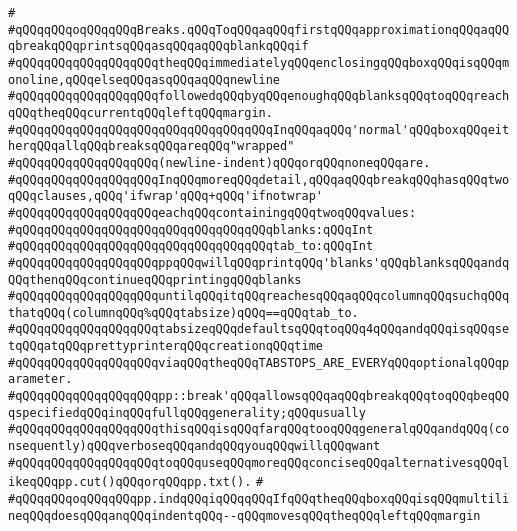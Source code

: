 \verb|#|\newline
\verb|#qQQqqQQqoqQQqqQQqBreaks.qQQqToqQQqaqQQqfirstqQQqapproximationqQQqaqQQqbreakqQQqprintsqQQqasqQQqaqQQqblankqQQqif|\newline
\verb|#qQQqqQQqqQQqqQQqqQQqtheqQQqimmediatelyqQQqenclosingqQQqboxqQQqisqQQqmonoline,qQQqelseqQQqasqQQqaqQQqnewline|\newline
\verb|#qQQqqQQqqQQqqQQqqQQqfollowedqQQqbyqQQqenoughqQQqblanksqQQqtoqQQqreachqQQqtheqQQqcurrentqQQqleftqQQqmargin.|\newline
\verb|#qQQqqQQqqQQqqQQqqQQqqQQqqQQqqQQqqQQqInqQQqaqQQq'normal'qQQqboxqQQqeitherqQQqallqQQqbreaksqQQqareqQQq"wrapped"|\newline
\verb|#qQQqqQQqqQQqqQQqqQQq(newline-indent)qQQqorqQQqnoneqQQqare.|\newline
\verb|#qQQqqQQqqQQqqQQqqQQqInqQQqmoreqQQqdetail,qQQqaqQQqbreakqQQqhasqQQqtwoqQQqclauses,qQQq'ifwrap'qQQq+qQQq'ifnotwrap'|\newline
\verb|#qQQqqQQqqQQqqQQqqQQqeachqQQqcontainingqQQqtwoqQQqvalues:|\newline
\verb|#qQQqqQQqqQQqqQQqqQQqqQQqqQQqqQQqqQQqblanks:qQQqInt|\newline
\verb|#qQQqqQQqqQQqqQQqqQQqqQQqqQQqqQQqqQQqtab_to:qQQqInt|\newline
\verb|#qQQqqQQqqQQqqQQqqQQqppqQQqwillqQQqprintqQQq'blanks'qQQqblanksqQQqandqQQqthenqQQqcontinueqQQqprintingqQQqblanks|\newline
\verb|#qQQqqQQqqQQqqQQqqQQquntilqQQqitqQQqreachesqQQqaqQQqcolumnqQQqsuchqQQqthatqQQq(columnqQQq%qQQqtabsize)qQQq==qQQqtab_to.|\newline
\verb|#qQQqqQQqqQQqqQQqqQQqtabsizeqQQqdefaultsqQQqtoqQQq4qQQqandqQQqisqQQqsetqQQqatqQQqprettyprinterqQQqcreationqQQqtime|\newline
\verb|#qQQqqQQqqQQqqQQqqQQqviaqQQqtheqQQqTABSTOPS_ARE_EVERYqQQqoptionalqQQqparameter.|\newline
\verb|#qQQqqQQqqQQqqQQqqQQqpp::break'qQQqallowsqQQqaqQQqbreakqQQqtoqQQqbeqQQqspecifiedqQQqinqQQqfullqQQqgenerality;qQQqusually|\newline
\verb|#qQQqqQQqqQQqqQQqqQQqthisqQQqisqQQqfarqQQqtooqQQqgeneralqQQqandqQQq(consequently)qQQqverboseqQQqandqQQqyouqQQqwillqQQqwant|\newline
\verb|#qQQqqQQqqQQqqQQqqQQqtoqQQquseqQQqmoreqQQqconciseqQQqalternativesqQQqlikeqQQqpp.cut()qQQqorqQQqpp.txt().|\newline
\verb|#|\newline
\verb|#qQQqqQQqoqQQqqQQqpp.indqQQqiqQQqqQQqIfqQQqtheqQQqboxqQQqisqQQqmultilineqQQqdoesqQQqanqQQqindentqQQq--qQQqmovesqQQqtheqQQqleftqQQqmargin|\newline
